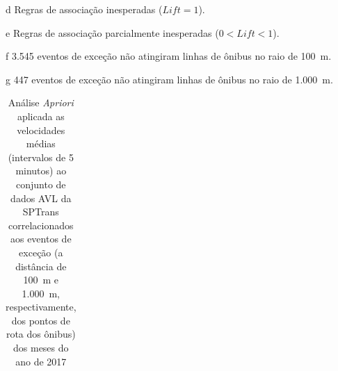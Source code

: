 \documentclass[
	12pt,				%
	oneside,			%
	a4paper,			%
	english,			%
	brazil				%
	]{abntex2ppgsi}
\begin{document}
{{\begin{table}[!htb]
\begin{threeparttable}
\begin{tablenotes}
            \item[d] Regras de associação inesperadas ($Lift = 1$).
            \item[e] Regras de associação parcialmente inesperadas ($0 < Lift < 1$).
            \item[f] 3.545 eventos de exceção não atingiram linhas de ônibus no raio de 100~m.
            \item[g] 447 eventos de exceção não atingiram linhas de ônibus no raio de 1.000~m.
        \end{tablenotes}
\end{threeparttable}
\end{table}

\begin{table}[!htb]
\centering
\begin{threeparttable}
\caption {Análise \textit{Apriori} aplicada as velocidades médias (intervalos de 5 minutos) ao conjunto de dados AVL da SPTrans correlacionados aos eventos de exceção (a distância de 100~m e 1.000~m, respectivamente, dos pontos de rota dos ônibus) dos meses do ano de 2017}
\label {tab:aprioriExceptFullShapes}
\begin{tabular}{c|c|c|c|c|c}
\toprule



\end{tabular}
\end{threeparttable}
\end{table}}}
\end{document}
